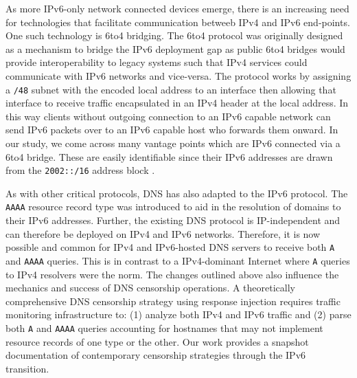 As more IPv6-only network connected devices emerge, there is an increasing need
for technologies that facilitate communication betweeb IPv4 and IPv6
end-points. One such technology is 6to4 bridging. The 6to4 protocol was
originally designed as a mechanism to bridge the IPv6 deployment gap as public
6to4 bridges would provide interoperability to legacy systems such that IPv4
services could communicate with IPv6 networks and vice-versa. The protocol
works by assigning a \texttt{/48} subnet with the encoded local address to an
interface then allowing that interface to receive traffic encapsulated in an
IPv4 header at the local address. In this way clients without outgoing
connection to an IPv6 capable network can send IPv6 packets over to an IPv6
capable host who forwards them onward. In our study, we come across many
vantage points which are IPv6 connected via a 6to4 bridge. These are easily
identifiable since their IPv6 addresses are drawn from the \texttt{2002::/16}
address block \cite{RFC3056}. 


As with other critical protocols, DNS has also adapted to the IPv6 protocol.
The {\tt AAAA} resource record type was introduced to aid in the resolution of
domains to their IPv6 addresses. Further, the existing DNS protocol is
IP-independent and can therefore be deployed on IPv4 and IPv6 networks.
Therefore, it is now possible and common for IPv4 and IPv6-hosted DNS servers
to receive both {\tt A} and {\tt AAAA} queries. This is in contrast to
a IPv4-dominant Internet where {\tt A} queries to IPv4 resolvers were the norm.
The changes outlined above also influence the mechanics and success of DNS
censorship operations. A theoretically comprehensive DNS censorship strategy
using response injection requires traffic monitoring infrastructure to: (1)
analyze both IPv4 and IPv6 traffic and (2) parse both \texttt{A} and
\texttt{AAAA} queries accounting for hostnames that may not implement resource
records of one type or the other. 
%
Our work provides a snapshot documentation of contemporary
censorship strategies through the IPv6 transition.


